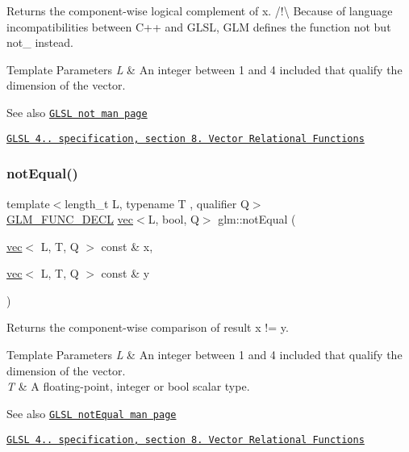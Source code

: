 Returns the component-\/wise logical complement of x. /!\textbackslash{} Because of language incompatibilities between C++ and G\+L\+SL, G\+LM defines the function not but not\+\_\+ instead.


\begin{DoxyTemplParams}{Template Parameters}
{\em L} & An integer between 1 and 4 included that qualify the dimension of the vector.\\
\hline
\end{DoxyTemplParams}
\begin{DoxySeeAlso}{See also}
\href{http://www.opengl.org/sdk/docs/manglsl/xhtml/not.xml}{\tt G\+L\+SL not man page} 

\href{http://www.opengl.org/registry/doc/GLSLangSpec.4.20.8.pdf}{\tt G\+L\+SL 4.. specification, section 8. Vector Relational Functions} 
\end{DoxySeeAlso}
\mbox{\label{group__core__func__vector__relational_gac5a72a973c81dc697dd8bb5d218e8251}} 
\subsubsection{\texorpdfstring{not\+Equal()}{notEqual()}}
{\footnotesize\ttfamily template$<$length\+\_\+t L, typename T , qualifier Q$>$ \\
\mbox{\hyperlink{setup_8hpp_ab2d052de21a70539923e9bcbf6e83a51}{G\+L\+M\+\_\+\+F\+U\+N\+C\+\_\+\+D\+E\+CL}} \mbox{\hyperlink{structglm_1_1vec}{vec}}$<$L, bool, Q$>$ glm\+::not\+Equal (\begin{DoxyParamCaption}\item[{\mbox{\hyperlink{structglm_1_1vec}{vec}}$<$ L, T, Q $>$ const \&}]{x,  }\item[{\mbox{\hyperlink{structglm_1_1vec}{vec}}$<$ L, T, Q $>$ const \&}]{y }\end{DoxyParamCaption})}

Returns the component-\/wise comparison of result x != y.


\begin{DoxyTemplParams}{Template Parameters}
{\em L} & An integer between 1 and 4 included that qualify the dimension of the vector. \\
\hline
{\em T} & A floating-\/point, integer or bool scalar type.\\
\hline
\end{DoxyTemplParams}
\begin{DoxySeeAlso}{See also}
\href{http://www.opengl.org/sdk/docs/manglsl/xhtml/notEqual.xml}{\tt G\+L\+SL not\+Equal man page} 

\href{http://www.opengl.org/registry/doc/GLSLangSpec.4.20.8.pdf}{\tt G\+L\+SL 4.. specification, section 8. Vector Relational Functions} 
\end{DoxySeeAlso}
